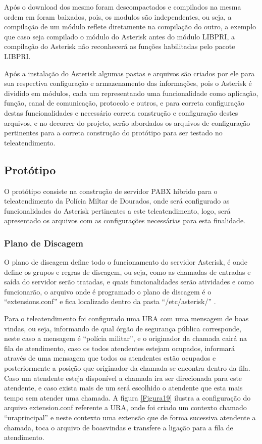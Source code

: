 Após o download dos mesmo foram descompactados e compilados na  mesma ordem em foram baixados, pois, os modulos são independentes, ou seja, a compilação de um módulo reflete diretamente na compilação do outro, a exemplo que caso seja compilado o módulo do Asterisk antes do módulo LIBPRI, a compilação do Asterisk não reconhecerá as funções habilitadas pelo pacote LIBPRI.

Após a instalação do Asterisk algumas pastas e arquivos são criados por ele para sua respectiva configuração e armazenamento das informações, pois o Asterisk é dividido em módulos, cada um representando uma funcionalidade como aplicação, função, canal de comunicação, protocolo e outros, e para correta configuração destas funcionalidades e necessário correta construção e configuração destes arquivos, e no decorrer do projeto, serão abordados os arquivos de configuração pertinentes para a correta construção do protótipo para ser testado no teleatendimento.

\subsection{Protótipo}
O protótipo consiste na construção de servidor PABX híbrido para o teleatendimento da Polícia Miltar de Dourados, onde será configurado as funcionalidades do Asterisk pertinentes a este teleatendimento, logo, será apresentado os arquivos com as configurações necessárias para esta finalidade.

\subsubsection{Plano de Discagem}
O plano de discagem define todo o funcionamento do servidor Asterisk, é onde define os grupos e regras de discagem, ou seja, como as chamadas de entradas e saída do servidor serão tratadas, e quais funcionalidades serão atividades e como funcionarão, o arquivo onde é programado o plano de discagem é o ``extensions.conf'' e fica localizado dentro da pasta ``/etc/asterisk/'' \cite{alexandrekeller2014}.

Para o teleatendimento foi configurado uma URA com uma mensagem de boas vindas, ou seja, informando de qual órgão de segurança pública corresponde, neste caso a mensagem é “polícia militar”, e o originador da chamada cairá na fila de atendimento,  caso os todos atendentes estejam ocupados, informará através de uma mensagem que todos os atendentes estão ocupados e posteriormente a posição que originador da chamada se encontra dentro da fila. Caso um atendente esteja disponível a chamada ira ser direcionada para este atendente, e caso exista mais de um será escolhido o atendente que esta mais tempo sem atender uma chamada. A figura \ref{Figura19} ilustra a configuração do arquivo extension.conf referente a URA, onde foi criado um contexto chamado “uraprincipal” e neste contexto uma extensão que de forma sucessiva atendente a chamada, toca o arquivo de boasvindas e transfere a ligação para a fila de atendimento.

